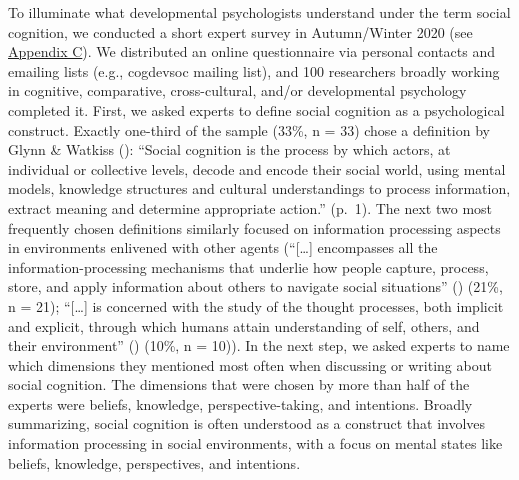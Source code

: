 \documentclass[
]{scrbook}
\begin{document}
To illuminate what developmental psychologists understand under the term social cognition, we conducted a short expert survey in Autumn/Winter 2020 (see \hyperref[appendixC]{Appendix C}). We distributed an online questionnaire via personal contacts and emailing lists (e.g., cogdevsoc mailing list), and 100 researchers broadly working in cognitive, comparative, cross-cultural, and/or developmental psychology completed it. First, we asked experts to define social cognition as a psychological construct. Exactly one-third of the sample (33\%, n = 33) chose a definition by Glynn \& Watkiss (): ``Social cognition is the process by which actors, at individual or collective levels, decode and encode their social world, using mental models, knowledge structures and cultural understandings to process information, extract meaning and determine appropriate action.'' (p.~1). The next two most frequently chosen definitions similarly focused on information processing aspects in environments enlivened with other agents (``{[}\ldots{]} encompasses all the information-processing mechanisms that underlie how people capture, process, store, and apply information about others to navigate social situations'' () (21\%, n = 21); ``{[}\ldots{]} is concerned with the study of the thought processes, both implicit and explicit, through which humans attain understanding of self, others, and their environment'' () (10\%, n = 10)). In the next step, we asked experts to name which dimensions they mentioned most often when discussing or writing about social cognition. The dimensions that were chosen by more than half of the experts were beliefs, knowledge, perspective-taking, and intentions. Broadly summarizing, social cognition is often understood as a construct that involves information processing in social environments, with a focus on mental states like beliefs, knowledge, perspectives, and intentions.
\end{document}
